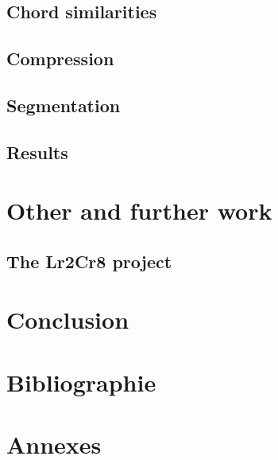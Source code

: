 \documentclass[a4paper,10pt]{article}
\begin{document}
\subsection{Chord similarities}

\subsection{Compression}

\subsection{Segmentation}

\subsection{Results}



\section{Other and further work}

\subsection{The Lr2Cr8 project}



\section{Conclusion}


\section{Bibliographie}




\newpage
\section{Annexes}
\end{document}
